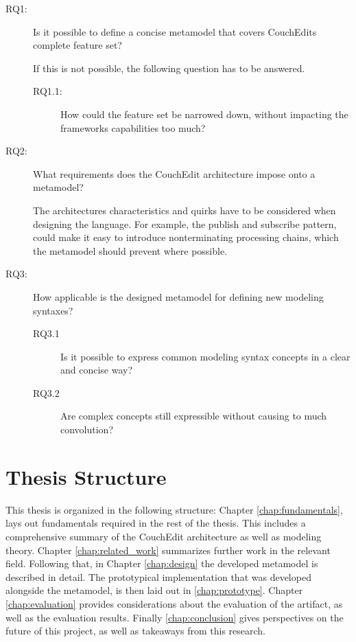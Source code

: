 \begin{description} 
  \item[RQ1:]  Is it possible to define a concise metamodel that covers CouchEdits complete feature set?

        If this is not possible, the following question has to be answered.
        \begin{description}
          \item[RQ1.1:] How could the feature set be narrowed down, without impacting the frameworks capabilities too much?
        \end{description}

  \item[RQ2:] What requirements does the CouchEdit architecture impose onto a metamodel?

        The architectures characteristics and quirks have to be considered when designing the language. For example, the publish and subscribe pattern, could make it easy to introduce nonterminating processing chains, which the metamodel should prevent where possible.

  \item[RQ3:] How applicable is the designed metamodel for defining new modeling syntaxes?

        \begin{description}
          \item[RQ3.1] Is it possible to express common modeling syntax concepts in a clear and concise way?
          \item[RQ3.2] Are complex concepts still expressible without causing to much convolution?
        \end{description}
\end{description}



\section{Thesis Structure}
This thesis is organized in the following structure: Chapter \ref{chap:fundamentals}, lays out fundamentals required in the rest of the thesis. This includes a comprehensive summary of the CouchEdit architecture as well as modeling theory. Chapter \ref{chap:related_work} summarizes further work in the relevant field. Following that, in Chapter \ref{chap:design} the developed metamodel is described in detail. The prototypical implementation that was developed alongside the metamodel, is then laid out in \ref{chap:prototype}. Chapter \ref{chap:evaluation} provides considerations about the evaluation of the artifact, as well as the evaluation results. Finally \ref{chap:conclusion} gives perspectives on the future of this project, as well as takeaways from this research.